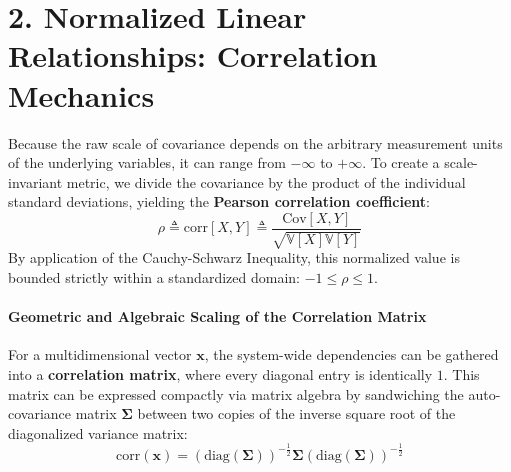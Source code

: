 \documentclass{article}
\begin{document}
\section*{2. Normalized Linear Relationships: Correlation Mechanics}

Because the raw scale of covariance depends on the arbitrary measurement units of the underlying variables, it can range from $-\infty$ to $+\infty$. To create a scale-invariant metric, we divide the covariance by the product of the individual standard deviations, yielding the \textbf{Pearson correlation coefficient}:
\begin{equation}
\rho \triangleq \text{corr}[X, Y] \triangleq \frac{\text{Cov}[X, Y]}{\sqrt{\mathbb{V}[X]\mathbb{V}[Y]}} \tag{6}
\end{equation}
By application of the Cauchy-Schwarz Inequality, this normalized value is bounded strictly within a standardized domain: $-1 \le \rho \le 1$.

\paragraph{Geometric and Algebraic Scaling of the Correlation Matrix}
For a multidimensional vector $\mathbf{x}$, the system-wide dependencies can be gathered into a \textbf{correlation matrix}, where every diagonal entry is identically $1$. This matrix can be expressed compactly via matrix algebra by sandwiching the auto-covariance matrix $\boldsymbol{\Sigma}$ between two copies of the inverse square root of the diagonalized variance matrix:
\begin{equation}
\text{corr}(\mathbf{x}) = \left(\text{diag}(\boldsymbol{\Sigma})\right)^{-\frac{1}{2}} \boldsymbol{\Sigma} \left(\text{diag}(\boldsymbol{\Sigma})\right)^{-\frac{1}{2}} \tag{7}
\end{equation}
\end{document}
